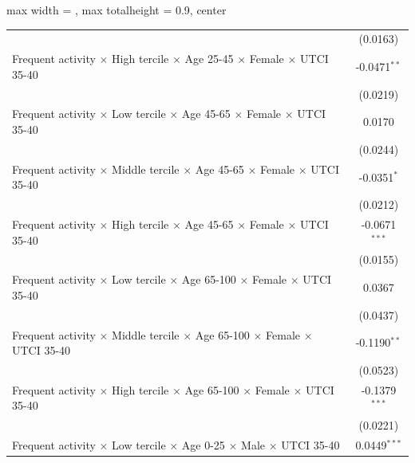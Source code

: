 \begin{table}[htbp]
\begin{adjustbox}{max width = \textwidth, max totalheight = 0.9\textheight, center}
\begin{tabular}{lc}
                                                                                                               & (0.0163)\\   
         Frequent activity $\times$ High tercile $\times$ Age 25-45 $\times$ Female $\times$ UTCI 35-40        & -0.0471$^{**}$\\   
                                                                                                               & (0.0219)\\   
         Frequent activity $\times$ Low tercile $\times$ Age 45-65 $\times$ Female $\times$ UTCI 35-40         & 0.0170\\   
                                                                                                               & (0.0244)\\   
         Frequent activity $\times$ Middle tercile $\times$ Age 45-65 $\times$ Female $\times$ UTCI 35-40      & -0.0351$^{*}$\\   
                                                                                                               & (0.0212)\\   
         Frequent activity $\times$ High tercile $\times$ Age 45-65 $\times$ Female $\times$ UTCI 35-40        & -0.0671$^{***}$\\   
                                                                                                               & (0.0155)\\   
         Frequent activity $\times$ Low tercile $\times$ Age 65-100 $\times$ Female $\times$ UTCI 35-40        & 0.0367\\   
                                                                                                               & (0.0437)\\   
         Frequent activity $\times$ Middle tercile $\times$ Age 65-100 $\times$ Female $\times$ UTCI 35-40     & -0.1190$^{**}$\\   
                                                                                                               & (0.0523)\\   
         Frequent activity $\times$ High tercile $\times$ Age 65-100 $\times$ Female $\times$ UTCI 35-40       & -0.1379$^{***}$\\   
                                                                                                               & (0.0221)\\   
         Frequent activity $\times$ Low tercile $\times$ Age 0-25 $\times$ Male $\times$ UTCI 35-40            & 0.0449$^{***}$\\   

\end{tabular}
\end{adjustbox}
\end{table}
